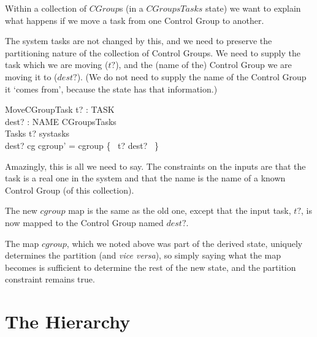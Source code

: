 \documentclass[a4paper,twoside,12pt]{article}
\begin{document}
Within a collection of $CGroup$s (in a $CGroupsTasks$ state) we want to explain what happens if we move a task from one Control Group to another.

The system tasks are not changed by this, and we need to preserve the partitioning nature of the collection of Control Groups. We need to supply the task which we are moving ($t?$), and the (name of the) Control Group we are moving it to ($dest?$). (We do not need to supply the name of the Control Group it `comes from', because the state has that information.)

\begin{schema}{MoveCGroupTask}
t? : TASK \\
dest? : NAME
\also
\Delta CGroupsTasks \\
\Xi Tasks 
\where
t? \in systasks \\
dest? \in \dom cg
\also
cgroup' = cgroup \oplus \{ ~t? \mapsto dest? ~\}
\end{schema}
Amazingly, this is all we need to say.  The constraints on the inputs are that the task is a real one in the system and that the name is the name of a known Control Group (of this collection).

The new $cgroup$ map is the same as the old one, except that the input task, $t?$, is now mapped to the Control Group named $dest?$.

The map $cgroup$, which we noted above was part of the derived state, uniquely determines the partition (and \emph{vice versa}), so simply saying what the map becomes is sufficient to determine the rest of the new state, and the partition constraint remains true.

\section{The Hierarchy}
\end{document}
